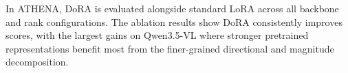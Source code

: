In ATHENA, DoRA is evaluated alongside standard LoRA across all backbone and rank configurations. The ablation results show DoRA consistently improves scores, with the largest gains on Qwen3.5-VL where stronger pretrained representations benefit most from the finer-grained directional and magnitude decomposition.
